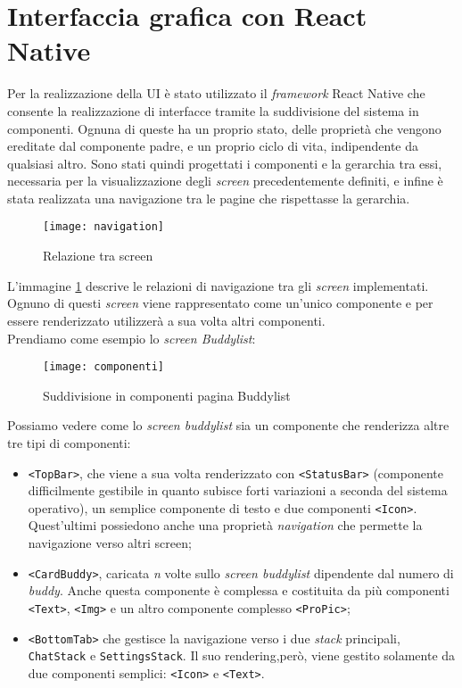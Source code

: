 \section{Interfaccia grafica con React Native}
Per la realizzazione della UI è stato utilizzato il \emph{framework} React Native che consente la realizzazione di interfacce tramite la suddivisione del sistema in componenti. Ognuna di queste ha un proprio stato, delle proprietà che vengono ereditate dal componente padre, e un proprio ciclo di vita,
indipendente da qualsiasi altro.
\newline
Sono stati quindi progettati i componenti e la gerarchia tra essi, necessaria per la visualizzazione degli \emph{screen} precedentemente definiti, e infine è stata realizzata una navigazione tra le pagine che rispettasse la gerarchia.
\begin{figure}[H] 
	\centering
	\texttt{[image: navigation]}
	\caption{Relazione tra screen}
	\label{gerarchiaRN}
\end{figure}
L'immagine \ref{gerarchiaRN} descrive le relazioni di navigazione tra gli \emph{screen} implementati. Ognuno di questi \emph{screen} viene rappresentato come un'unico componente e per essere renderizzato utilizzerà a sua volta altri componenti.\\
Prendiamo come esempio lo \emph{screen Buddylist}:
\begin{figure}[H] 
	\centering
	\texttt{[image: componenti]}
	\caption{Suddivisione in componenti pagina Buddylist}
\end{figure}
Possiamo vedere come lo \emph{screen buddylist} sia un componente che renderizza altre tre tipi di componenti: 
\begin{itemize}
	\item \texttt{<TopBar>}, che viene a sua volta renderizzato con \texttt{<StatusBar>} (componente difficilmente gestibile in quanto subisce forti variazioni a seconda del sistema operativo), un semplice componente di testo e due componenti \texttt{<Icon>}. Quest'ultimi possiedono anche una proprietà \emph{navigation} che permette la navigazione verso altri screen;
	\item \texttt{<CardBuddy>}, caricata \emph{n} volte sullo \emph{screen buddylist} dipendente dal numero di \emph{buddy}. Anche questa componente è complessa e costituita da più componenti \texttt{<Text>}, \texttt{<Img>} e un altro componente complesso \texttt{<ProPic>};
	\item \texttt{<BottomTab>} che gestisce la navigazione verso i due
	\emph{stack} principali, \texttt{ChatStack} e \texttt{SettingsStack}. Il
	suo rendering,però, viene gestito solamente da due componenti semplici:
	\texttt{<Icon>} e \texttt{<Text>}.
\end{itemize}

